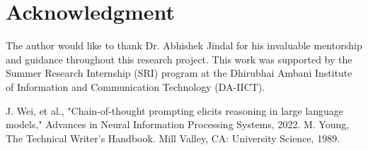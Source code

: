 \documentclass[conference]{IEEEtran}
\begin{document}
\section*{Acknowledgment}
The author would like to thank Dr. Abhishek Jindal for his invaluable mentorship and guidance throughout this research project. This work was supported by the Summer Research Internship (SRI) program at the Dhirubhai Ambani Institute of Information and Communication Technology (DA-IICT).

\begin{thebibliography}{00}
 J. Wei, et al., "Chain-of-thought prompting elicits reasoning in large language models," Advances in Neural Information Processing Systems, 2022.
 M. Young, The Technical Writer's Handbook. Mill Valley, CA: University Science, 1989.
\end{thebibliography}
\end{document}
